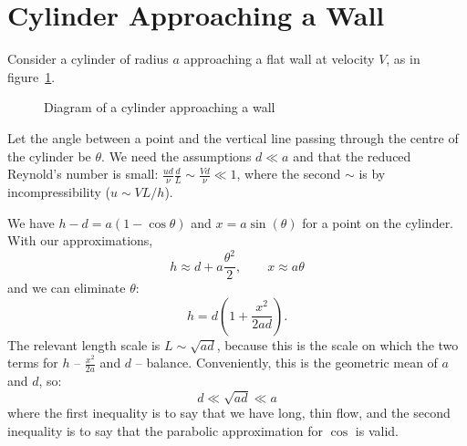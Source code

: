 \documentclass[../Main.tex]{subfiles}
\begin{document}
\section{Cylinder Approaching a Wall}
Consider a cylinder of radius $a$ approaching a flat wall at velocity $V$, as in figure~\ref{figCylinderWall}.
\begin{figure}
    \centering
    \caption{Diagram of a cylinder approaching a wall}
    \label{figCylinderWall}
\end{figure}
Let the angle between a point and the vertical line passing through the centre of the cylinder be $\theta$. We need the assumptions $d \ll a$ and that the reduced Reynold's number is small: $\frac{u d}{\nu} \frac{d}{L} \sim \frac{Vd}{\nu} \ll 1$, where the second $\sim$ is by incompressibility ($u \sim VL / h$).

We have $h - d = a(1 - \cos\theta)$ and $x = a\sin(\theta)$ for a point on the cylinder. With our approximations,
\begin{equation*}
    h \approx d + a \frac{\theta^2}{2},\qquad x\approx a\theta
\end{equation*}
and we can eliminate $\theta$:
\begin{equation*}
    h = d\left(1 + \frac{x^2}{2ad}\right).
\end{equation*}
The relevant length scale is $L \sim \sqrt{ad}$, because this is the scale on which the two terms for $h$ -- $\frac{x^2}{2a}$ and $d$ -- balance. Conveniently, this is the geometric mean of $a$ and $d$, so:
\begin{equation*}
    d \ll \sqrt{ad} \ll a
\end{equation*}
where the first inequality is to say that we have long, thin flow, and the second inequality is to say that the parabolic approximation for $\cos$ is valid.
\end{document}
